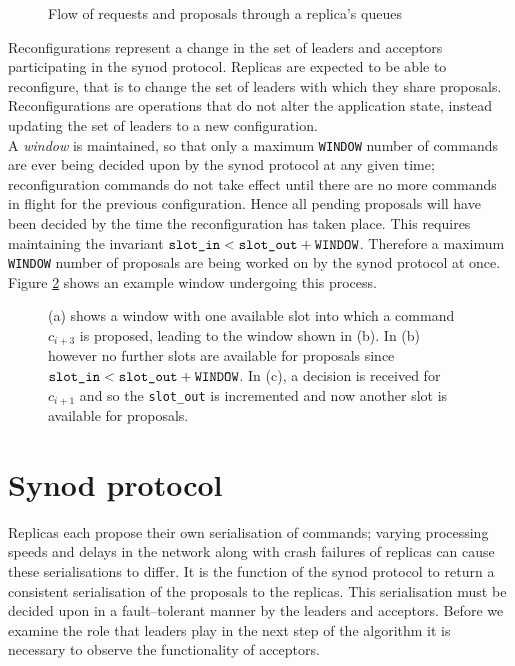 \begin{figure}
  \scalebox{0.7}{
    }
  \caption{Flow of requests and proposals through a replica's queues}
  \label{fig:replica-queues}
\end{figure}
  
Reconfigurations represent a change in the set of leaders and acceptors participating in the synod protocol. Replicas are expected to be able to reconfigure, that is to change the set of leaders with which they share proposals. Reconfigurations are operations that do not alter the application state, instead updating the set of leaders to a new configuration. \\

A \emph{window} is maintained, so that only a maximum \texttt{WINDOW} number of commands are ever being decided upon by the synod protocol at any given time; reconfiguration commands do not take effect until there are no more commands in flight for the previous configuration. Hence all pending proposals will have been decided by the time the reconfiguration has taken place. This requires maintaining the invariant $ \textrm{\texttt{slot\_in}} < \textrm{\texttt{slot\_out}} + \textrm{\texttt{WINDOW}} $. Therefore a maximum \texttt{WINDOW} number of proposals are being worked on by the synod protocol at once. Figure \ref{fig:replica-window} shows an example window undergoing this process. \\

\begin{figure}
  \centering
    \scalebox{0.8}{
      
    }
  \caption{(a) shows a window with one available slot into which a command $c_{i+3}$ is proposed, leading to the window shown in (b). In (b) however no further slots are available for proposals since $ \textrm{\texttt{slot\_in}} < \textrm{\texttt{slot\_out}} + \textrm{\texttt{WINDOW}} $. In (c), a decision is received for $c_{i+1}$ and so the \texttt{slot\_out} is incremented and now another slot is available for proposals.}
  \label{fig:replica-window}  
\end{figure}



\section{Synod protocol}

Replicas each propose their own serialisation of commands; varying processing speeds and delays in the network along with crash failures of replicas can cause these serialisations to differ. It is the function of the synod protocol to return a consistent serialisation of the proposals to the replicas. This serialisation must be decided upon in a fault--tolerant manner by the leaders and acceptors. Before we examine the role that leaders play in the next step of the algorithm it is necessary to observe the functionality of acceptors.

